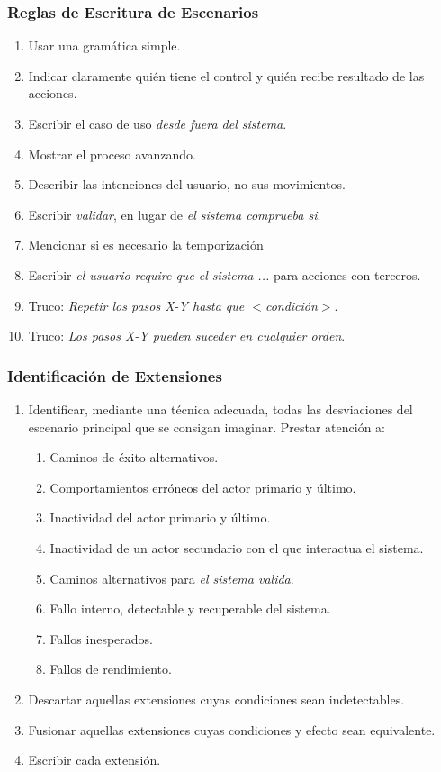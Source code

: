 \documentclass[handout,slidestop,xcolor=pst,dvips,blue]{beamer}
\begin{document}
\begin{frame}[c]
    \frametitle{Reglas de Escritura de Escenarios}
    \begin{enumerate}[<+->]
        \item Usar una gramática simple.
        \item Indicar claramente quién tiene el control y quién recibe resultado de las acciones.
        \item Escribir el caso de uso \emph{desde fuera del sistema}.
        \item Mostrar el proceso avanzando.
        \item Describir las intenciones del usuario, no sus movimientos.
        \item Escribir \emph{validar}, en lugar de \emph{el sistema comprueba si}.
        \item Mencionar si es necesario la temporización
        \item Escribir \emph{el usuario require que el sistema ...} para acciones con terceros.
        \item Truco: \emph{Repetir los pasos X-Y hasta que $<$condición$>$}.
        \item Truco: \emph{Los pasos X-Y pueden suceder en cualquier orden}.
    \end{enumerate}
\end{frame}

\begin{frame}[c]
    \frametitle{Identificación de Extensiones}
    \begin{enumerate}[<+->]
        \item Identificar, mediante una técnica adecuada, todas las desviaciones del escenario principal que se consigan imaginar. Prestar atención a:
            \begin{enumerate}
                \item Caminos de éxito alternativos.
                \item Comportamientos erróneos del actor primario y último.
                \item Inactividad del actor primario y último.
                \item Inactividad de un actor secundario con el que interactua el sistema.
                \item Caminos alternativos para \emph{el sistema valida}.
                \item Fallo interno, detectable y recuperable del sistema.
                \item Fallos inesperados.
                \item Fallos de rendimiento.
            \end{enumerate}
        \item Descartar aquellas extensiones cuyas condiciones sean indetectables.
        \item Fusionar aquellas extensiones cuyas condiciones y efecto sean equivalente.
        \item Escribir cada extensión.
    \end{enumerate}
\end{frame}
\end{document}
